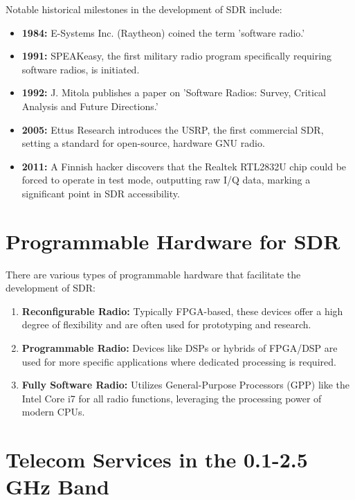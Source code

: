 Notable historical milestones in the development of SDR include:
\begin{itemize}
    \item \textbf{1984:} E-Systems Inc. (Raytheon) coined the term 'software radio.'
    \item \textbf{1991:} SPEAKeasy, the first military radio program specifically requiring software radios, is initiated.
    \item \textbf{1992:} J. Mitola publishes a paper on 'Software Radios: Survey, Critical Analysis and Future Directions.'
    \item \textbf{2005:} Ettus Research introduces the USRP, the first commercial SDR, setting a standard for open-source, hardware GNU radio.
    \item \textbf{2011:} A Finnish hacker discovers that the Realtek RTL2832U chip could be forced to operate in test mode, outputting raw I/Q data, marking a significant point in SDR accessibility.
\end{itemize}


\section*{Programmable Hardware for SDR}

There are various types of programmable hardware that facilitate the development of SDR:
\begin{enumerate}
    \item \textbf{Reconfigurable Radio:} Typically FPGA-based, these devices offer a high degree of flexibility and are often used for prototyping and research.
    \item \textbf{Programmable Radio:} Devices like DSPs or hybrids of FPGA/DSP are used for more specific applications where dedicated processing is required.
    \item \textbf{Fully Software Radio:} Utilizes General-Purpose Processors (GPP) like the Intel Core i7 for all radio functions, leveraging the processing power of modern CPUs.
\end{enumerate}

\section*{Telecom Services in the 0.1-2.5 GHz Band}

